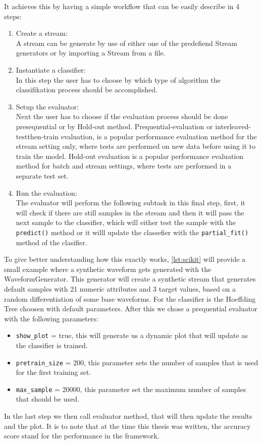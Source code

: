 \documentclass[12pt,oneside,a4paper,parskip]{scrbook}
\begin{document}
It achieves this by having a simple workflow that can be easily describe in 4 steps:

\begin{enumerate}
  \item Create a stream: \\
        A stream can be generate by use of either one of the predefiend Stream generators or by importing a Stream from a file.
  \item Instantiate a classifier: \\
        In this step the user has to choose by which type of algorithm the classifikation process should be accomplished.
  \item Setup the evaluator: \\
        Next the user has to choose if the evaluation process should be done presequential or by Hold-out method.
  Prequential-evaluation or interleaved-testthen-train evaluation, is a popular performance 
  evaluation method for the stream setting only, where tests are performed on new data before using it to train the model.
  Hold-out evaluation is a popular performance evaluation method for batch and stream settings, where tests are performed 
  in a separate test set. \cite{skmultiflow}
  \item Run the evaluation: \\
        The evaluator will perform the following subtask in this final step,
  first, it will check if there are still samples in the stream and then it will pass the next sample to the classifier,
  which will either test the sample with the \verb|predict()| method or it willl update the classefier with the \verb|partial_fit()|
  method of the clasifier.
\end{enumerate}
  
To give better understanding how this exactly works, \ref{lst:scikit} will provide a small example where a synthetic waveform gets 
generated with the WaveformGenerator. This generator will create a synthetic stream that generates default samples with
21 numeric attributes and 3 target values, based on a random differentiation of some base waveforms.
For the classifier is the Hoeffding Tree choosen with default parameters.
After this we chose a prequential evaluator with the following parameters: 
\begin{itemize}
  \item \verb|show_plot| = true, this will generate us a dynamic plot that will update as the classifier is trained.
  \item \verb|pretrain_size| = 200, this parameter sets the number of samples that is used for the first training set.
  \item \verb|max_sample| = 20000, this parameter set the maximum number of samples that should be used.
\end{itemize}
In the last step we then call evaluator method, that will then update the results and the plot.
It is to note that at the time this thesis was written, the accuracy score stand for the performance 
in the framework.  \cite{skmultiflow}
\end{document}
